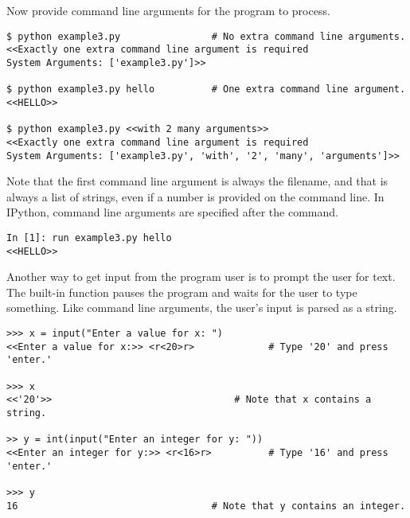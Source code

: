 Now provide command line arguments for the program to process.

\begin{lstlisting}
$ python example3.py                # No extra command line arguments.
<<Exactly one extra command line argument is required
System Arguments: ['example3.py']>>

$ python example3.py hello          # One extra command line argument.
<<HELLO>>

$ python example3.py <<with 2 many arguments>>
<<Exactly one extra command line argument is required
System Arguments: ['example3.py', 'with', '2', 'many', 'arguments']>>
\end{lstlisting}

Note that the first command line argument is always the filename, and that  is always a list of strings, even if a number is provided on the command line.
In IPython, command line arguments are specified after the  command.

\begin{lstlisting}
In [1]: run example3.py hello
<<HELLO>>
\end{lstlisting}

Another way to get input from the program user is to prompt the user for text.
The built-in function  pauses the program and waits for the user to type something.
Like command line arguments, the user's input is parsed as a string.

\begin{lstlisting}
>>> x = input("Enter a value for x: ")
<<Enter a value for x:>> <r<20>r>             # Type '20' and press 'enter.'

>>> x
<<'20'>>                                # Note that x contains a string.

>> y = int(input("Enter an integer for y: "))
<<Enter an integer for y:>> <r<16>r>          # Type '16' and press 'enter.'

>>> y
16                                  # Note that y contains an integer.
\end{lstlisting}

